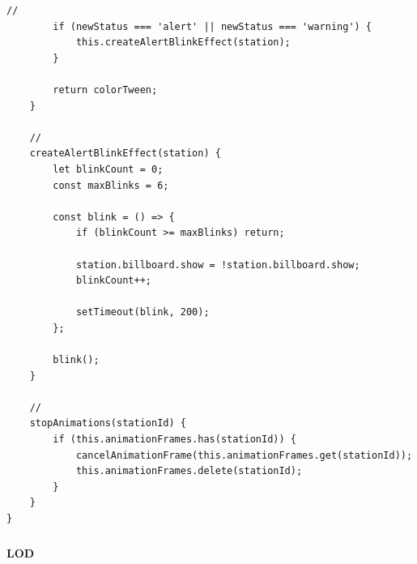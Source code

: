 \begin{lstlisting}[style=javascript]
        // 
        if (newStatus === 'alert' || newStatus === 'warning') {
            this.createAlertBlinkEffect(station);
        }
        
        return colorTween;
    }
    
    // 
    createAlertBlinkEffect(station) {
        let blinkCount = 0;
        const maxBlinks = 6;
        
        const blink = () => {
            if (blinkCount >= maxBlinks) return;
            
            station.billboard.show = !station.billboard.show;
            blinkCount++;
            
            setTimeout(blink, 200);
        };
        
        blink();
    }
    
    // 
    stopAnimations(stationId) {
        if (this.animationFrames.has(stationId)) {
            cancelAnimationFrame(this.animationFrames.get(stationId));
            this.animationFrames.delete(stationId);
        }
    }
}
\end{lstlisting}

\hypertarget{section-149}{%
\subsubsection{}\label{section-149}}

\hypertarget{lod}{%
\paragraph{LOD}\label{lod}}

